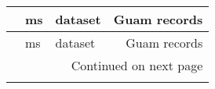 \begin{longtable}{llp{5in}r}
\toprule
{} & ms &                                                                                                                                                                                                                                                                    dataset &  Guam records \\
\midrule
\endfirsthead

\toprule
{} & ms &                                                                                                                                                                                                                                                                    dataset &  Guam records \\
\midrule
\endhead
\midrule
\multicolumn{4}{r}{{Continued on next page}} \\
\midrule
\endfoot


\end{longtable}
